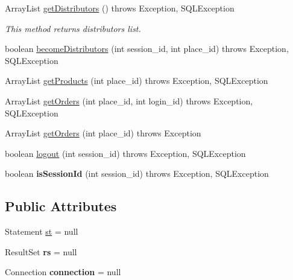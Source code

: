 \begin{DoxyCompactItemize}
Array\-List \hyperlink{classLunchDBConnect_aee30ee2c50bc62cff7c90c008a9dfaca}{get\-Distributors} ()  throws Exception, S\-Q\-L\-Exception 
\begin{DoxyCompactList}\small\item\em This method returns distributors list. \end{DoxyCompactList}\item 
boolean \hyperlink{classLunchDBConnect_a157f79bfaf2bbcdec75359bdf367dd13}{become\-Distributors} (int session\-\_\-id, int place\-\_\-id)  throws Exception, S\-Q\-L\-Exception 
\item 
Array\-List \hyperlink{classLunchDBConnect_ae27a160ac7fb6d9479a846702ebd369a}{get\-Products} (int place\-\_\-id)  throws Exception, S\-Q\-L\-Exception 
\item 
Array\-List \hyperlink{classLunchDBConnect_a3cbd1e6a559d53ba9cc6fab30960822b}{get\-Orders} (int place\-\_\-id, int login\-\_\-id)  throws Exception, S\-Q\-L\-Exception 
\item 
Array\-List \hyperlink{classLunchDBConnect_afb748b0d9622a4359d616c8eec001f38}{get\-Orders} (int place\-\_\-id)  throws Exception 
\item 
boolean \hyperlink{classLunchDBConnect_abe6933d6541998fd1ba42dbea48ee68f}{logout} (int session\-\_\-id)  throws Exception, S\-Q\-L\-Exception 
\item 
\hypertarget{classLunchDBConnect_a7fe996882e748aa053606041fd6d3434}{boolean {\bfseries is\-Session\-Id} (int session\-\_\-id)  throws Exception, S\-Q\-L\-Exception }\label{classLunchDBConnect_a7fe996882e748aa053606041fd6d3434}

\end{DoxyCompactItemize}
\subsection*{Public Attributes}
\begin{DoxyCompactItemize}
\item 
Statement \hyperlink{classLunchDBConnect_a2b9de5ddf98993d2f862b5e387f36f55}{st} = null
\item 
\hypertarget{classLunchDBConnect_ac26817820c519e262ac3e1831da9bf5a}{Result\-Set {\bfseries rs} = null}\label{classLunchDBConnect_ac26817820c519e262ac3e1831da9bf5a}

\item 
\hypertarget{classLunchDBConnect_a77a8519758217bb2ac62cafbed92d931}{Connection {\bfseries connection} = null}\label{classLunchDBConnect_a77a8519758217bb2ac62cafbed92d931}

\end{DoxyCompactItemize}


